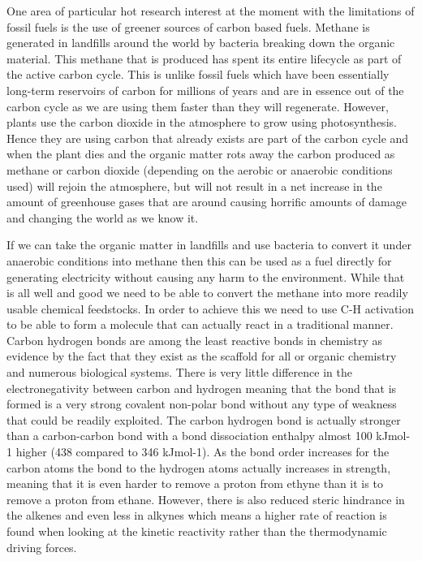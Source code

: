 One area of particular hot research interest at the moment with the limitations of fossil fuels is the use of greener sources of carbon based fuels.  Methane is generated in landfills around the world by bacteria breaking down the organic material.  This methane that is produced has spent its entire lifecycle as part of the active carbon cycle.  This is unlike fossil fuels which have been essentially long-term reservoirs of carbon for millions of years and are in essence out of the carbon cycle as we are using them faster than they will regenerate.  However, plants use the carbon dioxide in the atmosphere to grow using photosynthesis.  Hence they are using carbon that already exists are part of the carbon cycle and when the plant dies and the organic matter rots away the carbon produced as methane or carbon dioxide (depending on the aerobic or anaerobic conditions used) will rejoin the atmosphere, but will not result in a net increase in the amount of greenhouse gases that are around causing horrific amounts of damage and changing the world as we know it.

If we can take the organic matter in landfills and use bacteria to convert it under anaerobic conditions into methane then this can be used as a fuel directly for generating electricity without causing any harm to the environment.  While that is all well and good we need to be able to convert the methane into more readily usable chemical feedstocks.  In order to achieve this we need to use C-H activation to be able to form a molecule that can actually react in a traditional manner.  Carbon hydrogen bonds are among the least reactive bonds in chemistry as evidence by the fact that they exist as the scaffold for all or organic chemistry and numerous biological systems.  There is very little difference in the electronegativity between carbon and hydrogen meaning that the bond that is formed is a very strong covalent non-polar bond without any type of weakness that could be readily exploited.  The carbon hydrogen bond is actually stronger than a carbon-carbon bond with a bond dissociation enthalpy almost 100 kJmol-1 higher (438 compared to 346 kJmol-1).  As the bond order increases for the carbon atoms the bond to the hydrogen atoms actually increases in strength, meaning that it is even harder to remove a proton from ethyne than it is to remove a proton from ethane.  However, there is also reduced steric hindrance in the alkenes and even less in alkynes which means a higher rate of reaction is found when looking at the kinetic reactivity rather than the thermodynamic driving forces.  

